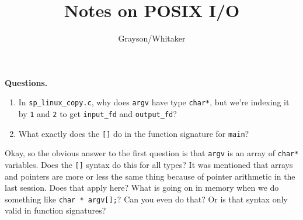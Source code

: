 \documentclass[12pt, reqno, twoside]{amsart}
\title{Notes on POSIX I/O}
\author{Grayson/Whitaker}
\newcommand{\ert}{\texttt}
\begin{document}
\maketitle
\textbf{Questions.}
\begin{enumerate}[label=\textbf{\arabic*.}]
    \item In \ert{sp\_linux\_copy.c}, why does \ert{argv} have type \ert{char*}, but we're indexing it by \ert{1} and \ert{2} to get \ert{input\_fd} and \ert{output\_fd}?
    \item What exactly does the \ert{[]} do in the function signature for \ert{main}? 
\end{enumerate}
Okay, so the obvious answer to the first question is that \ert{argv} is an array of \ert{char*} variables. Does the \ert{[]} syntax do this for all types? It was mentioned that arrays and pointers are more or less the same thing because of pointer arithmetic in the last session. Does that apply here? What is going on in memory when we do something like \ert{char * argv[];}? Can you even do that? Or is that syntax only valid in function signatures?
\end{document}
